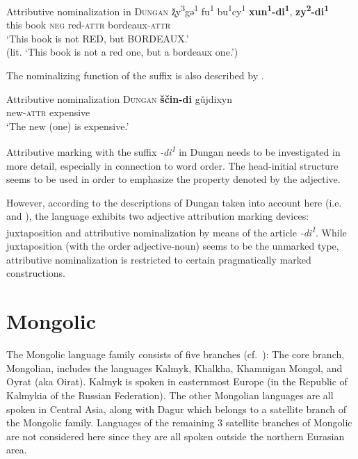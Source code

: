 \begin{exe}
\ex Attributive nominalization in \textsc{Dungan} \cite[82]{zevachina2001}
\gll	ž̨y\textsuperscript{3}gə\textsuperscript{1} fu\textsuperscript{1} bu\textsuperscript{1}cy\textsuperscript{1} \textbf{xun\textsuperscript{1}-di\textsuperscript{1}}, \textbf{zy\textsuperscript{2}-di\textsuperscript{1}}\\
	this book \textsc{neg} red-\textsc{attr} bordeaux-\textsc{attr}\\
\glt	‘This book is not RED, but BORDEAUX.’\\
	(lit. ‘This book is not a red one, but a bordeaux one.’)
\end{exe}
The nominalizing function of the suffix is also described by \cite{kalimov1968}.
\newpage
\begin{exe}
\ex Attributive nominalization \textsc{Dungan} \cite[484]{kalimov1968} \label{dungan nmlz}
\gll	\textbf{ščin-di} gǔjdixyn\\
	new-\textsc{attr} expensive\\
\glt	‘The new (one) is expensive.’
\end{exe}
Attributive marking with the suffix \textit{-di\textsuperscript{1}} in Dungan needs to be investigated in more detail, especially in connection to word order. The head-initial structure seems to be used in order to emphasize the property denoted by the adjective.

However, according to the descriptions of Dungan taken into account here (i.e.~\citealt{kalimov1968} and \citealt{zevachina2001}), the language exhibits two adjective attribution marking devices: juxtaposition and attributive nominalization by means of the article \textit{-di\textsuperscript{1}}. While juxtaposition (with the order adjective-noun) seems to be the unmarked type, attributive nominalization is restricted to certain pragmatically marked constructions.

\section{Mongolic}
The Mongolic language family consists of five branches (cf.~\citealt[222]{salminen2007}): The core branch, Mongolian, includes the languages Kalmyk, Khalkha, Khamnigan Mongol, and Oyrat (aka Oirat). Kalmyk is spoken in easternmost Europe (in the Republic of Kalmykia of the Russian Federation). The other Mongolian languages are all spoken in Central Asia, along with Dagur which belongs to a satellite branch of the Mongolic family. Languages of the remaining 3 satellite branches of Mongolic are not considered here since they are all spoken outside the northern Eurasian area.\\
				
